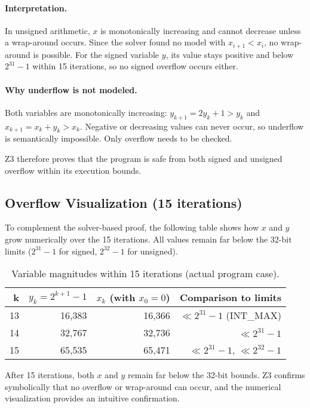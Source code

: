 \documentclass[a4paper,11pt]{article}
\begin{document}
\paragraph{Interpretation.}
In unsigned arithmetic, $x$ is monotonically increasing and cannot decrease
unless a wrap-around occurs. Since the solver found no model with $x_{i+1}<x_i$,
no wrap-around is possible. For the signed variable $y$, its value stays
positive and below $2^{31}-1$ within 15 iterations, so no signed overflow
occurs either.

\paragraph{Why underflow is not modeled.}
Both variables are monotonically increasing:
$y_{k+1}=2y_k+1>y_k$ and $x_{k+1}=x_k+y_k>x_k$.
Negative or decreasing values can never occur, so underflow is semantically
impossible. Only overflow needs to be checked.

\noindent
Z3 therefore proves that the program is safe from both signed and unsigned
overflow within its execution bounds.

\subsection*{Overflow Visualization (15 iterations)}

To complement the solver-based proof, the following table shows how $x$ and $y$
grow numerically over the 15 iterations. All values remain far below the 32-bit
limits ($2^{31}-1$ for signed, $2^{32}-1$ for unsigned).

\begin{table}[h]
\centering
\begin{tabular}{r|r|r|r}
\textbf{k} & \(y_k = 2^{k+1}-1\) & \(x_k\) (with \(x_0=0\)) & Comparison to limits \\\hline
13 & 16,383 & 16,366 & $\ll 2^{31}-1$ (INT\_MAX) \\
14 & 32,767 & 32,736 & $\ll 2^{31}-1$ \\
15 & 65,535 & 65,471 & $\ll 2^{31}-1$, $\ll 2^{32}-1$
\end{tabular}
\caption{Variable magnitudes within 15 iterations (actual program case).}
\end{table}

\noindent
After 15 iterations, both $x$ and $y$ remain far below the 32-bit bounds.
Z3 confirms symbolically that no overflow or wrap-around can occur,
and the numerical visualization provides an intuitive confirmation.
\end{document}
